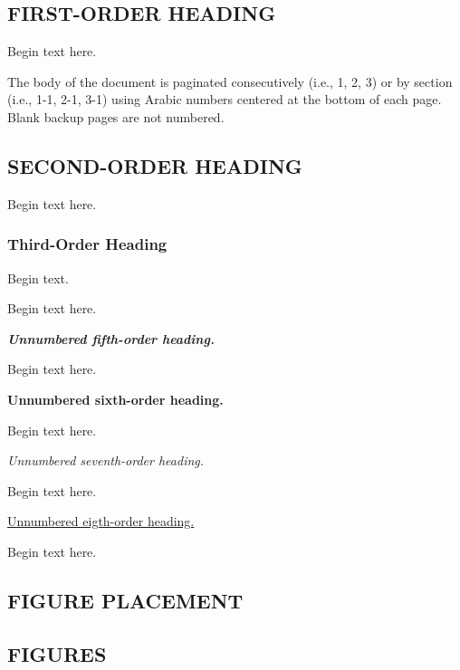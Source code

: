 \documentclass[11pt,letterpaper,twoside,english,final]{article}
\begin{document}
{\begin{center}
\section{FIRST-ORDER HEADING}
\end{center}

Begin text here.  

The body of the document is paginated consecutively (i.e., 1, 2, 3) or by section (i.e., 1-1, 2-1, 3-1) using Arabic numbers centered at the bottom of each page. Blank backup pages are not numbered.

\subsection{SECOND-ORDER HEADING}

Begin text here. 

\subsubsection{Third-Order Heading}

Begin text. 


Begin text here. 

{\noindent \bf\emph {Unnumbered fifth-order heading.}} 

Begin text here. 

{\noindent \bf {Unnumbered sixth-order heading.}}  

Begin text here. 

{\noindent \emph {Unnumbered seventh-order heading.}}  

Begin text here. 

{\noindent \underline {Unnumbered eigth-order heading.}}  

Begin text here. 


\newpage
\clearemptydoublepage

\begin{center}
\section{FIGURE PLACEMENT}
\end{center}

\subsection{FIGURES}

}
\end{document}
